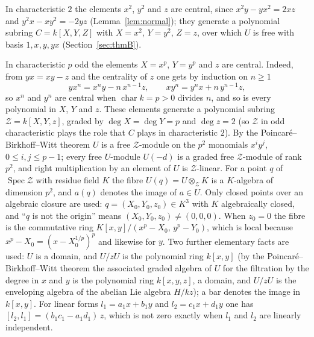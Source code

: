\documentclass[11pt]{article}
\theoremstyle{definition}
\theoremstyle{remark}
\newcommand{\ch}{\operatorname{char}}
\begin{document}
In characteristic $2$ the elements $x^2$, $y^2$ and $z$ are central, since $x^2y-yx^2=2xz$ and $y^2x-xy^2=-2yz$ (Lemma~\ref{lem:normal}); they generate a polynomial subring $C=k[X,Y,Z]$ with $X=x^2$, $Y=y^2$, $Z=z$, over which $U$ is free with basis $1,x,y,yx$ (Section~\ref{sec:thmB}).

In characteristic $p$ odd the elements $X=x^p$, $Y=y^p$ and $z$ are central. Indeed, from $yx=xy-z$ and the centrality of $z$ one gets by induction on $n\ge1$
\begin{equation}\label{eq:powers}
yx^n=x^ny-n\,x^{n-1}z,\qquad xy^n=y^nx+n\,y^{n-1}z,
\end{equation}
so $x^n$ and $y^n$ are central when $\ch k=p>0$ divides $n$, and so is every polynomial in $X$, $Y$ and $z$. These elements generate a polynomial subring $\mathcal Z=k[X,Y,z]$, graded by $\deg X=\deg Y=p$ and $\deg z=2$ (so $\mathcal Z$ in odd characteristic plays the role that $C$ plays in characteristic $2$). By the Poincar\'e--Birkhoff--Witt theorem $U$ is a free $\mathcal Z$-module on the $p^2$ monomials $x^iy^j$, $0\le i,j\le p-1$; every free $U$-module $U(-d)$ is a graded free $\mathcal Z$-module of rank $p^2$, and right multiplication by an element of $U$ is $\mathcal Z$-linear. For a point $q$ of $\operatorname{Spec}\mathcal Z$ with residue field $K$ the fibre $U(q)=U\otimes_{\mathcal Z}K$ is a $K$-algebra of dimension $p^2$, and $a(q)$ denotes the image of $a\in U$. Only closed points over an algebraic closure are used: $q=(X_0,Y_0,z_0)\in K^3$ with $K$ algebraically closed, and ``$q$ is not the origin'' means $(X_0,Y_0,z_0)\ne(0,0,0)$. When $z_0=0$ the fibre is the commutative ring $K[x,y]/(x^p-X_0,\,y^p-Y_0)$, which is local because $x^p-X_0=(x-X_0^{1/p})^p$ and likewise for $y$. Two further elementary facts are used: $U$ is a domain, and $U/zU$ is the polynomial ring $k[x,y]$ (by the Poincar\'e--Birkhoff--Witt theorem the associated graded algebra of $U$ for the filtration by the degree in $x$ and $y$ is the polynomial ring $k[x,y,z]$, a domain, and $U/zU$ is the enveloping algebra of the abelian Lie algebra $H/kz$); a bar denotes the image in $k[x,y]$. For linear forms $l_1=a_1x+b_1y$ and $l_2=c_1x+d_1y$ one has $[l_2,l_1]=(b_1c_1-a_1d_1)\,z$, which is not zero exactly when $l_1$ and $l_2$ are linearly independent.
\end{document}
